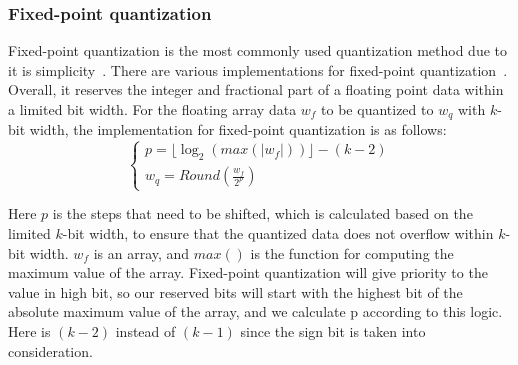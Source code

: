 \subsubsection{Fixed-point quantization}
\label{sec:fixed-point}
Fixed-point quantization is the most commonly used quantization method due to it is simplicity~\citep{zhou2016dorefa,gysel2016hardware,lin2016fixed}.
There are various implementations for fixed-point quantization~\citep{gysel2016hardware, zhou2016dorefa}. 
Overall, it reserves the integer and fractional part of a floating point data within a limited bit width.
For the floating array data $w_f$ to be quantized to $w_q$ with $k$-bit width,
the implementation for fixed-point quantization is as follows:
 \begin{equation}
 \label{fixed-point-quantization}
     \begin{cases}
         p=\lfloor \log_2(max(|w_f|)) \rfloor-(k-2)\\
         w_q=Round(\frac{w_f}{2^p})
     \end{cases}
 \end{equation}

Here $p$ is the steps that need to be shifted, which is calculated based on the limited $k$-bit width,  to ensure that the quantized data does not overflow within $k$-bit width. $w_f$ is an array, and $max()$ is the function for computing the maximum value of the array. Fixed-point quantization will give priority to the value in high bit, so our reserved bits will start with the highest bit of the absolute maximum value of the array, and we calculate p according to this logic. Here is $(k-2)$ instead of $(k-1)$ since the sign bit is taken into consideration.

